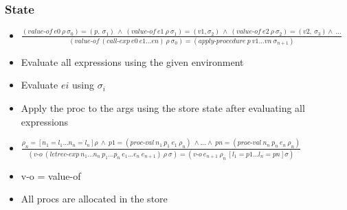 \documentclass{beamer}
\begin{document}
\begin{frame}[fragile]
\frametitle{State}
\begin{scriptsize}
\begin{itemize}
\item<1-> $\frac{(value\text{-}of \ e0 \ \rho \ \sigma_0)=(p, \ \sigma_1) \ \wedge \ (value\text{-}of \ e1 \ \rho \ \sigma_1)=(v1, \sigma_2) \ \wedge \ (value\text{-}of \ e2 \ \rho \ \sigma_2)=(v2, \ \sigma_3) \wedge \ \ldots}
    {(value\text{-}of \ (call\text{-}exp \ e0 \ e1\ldots en) \ \rho \ \sigma_0) = (apply\text{-}procedure \ p \ v1\ldots vn \ \sigma_{n+1})}$

\item<1-> Evaluate all expressions using the given environment

\item<1-> Evaluate $ei$ using $\sigma_i$

\item<1-> Apply the proc to the args using the store state after evaluating all expressions \newline

\item<2-> $\frac{\rho_n=\left[n_1=l_1\ldots n_n=l_n\right]\rho \ \wedge \ p1=(proc\text{-}val \ n_1 \ p_1 \ e_1 \ \rho_n) \ \wedge \ldots \wedge \ pn=(proc\text{-}val \ n_n \ p_n \ e_n \ \rho_n)}
                {(v\text{-}o \ (letrec\text{-}exp \ n_1\ldots n_n \ p_1\ldots p_n \ e_1\dots e_n \ e_{n+1}) \ \rho \ \sigma)=(v\text{-}o \ e_{n+1} \ \rho_n \ \left[l_1=p1\ldots l_n=pn \right]\sigma)}$

\item<2-> v-o = value-of

\item<2-> All procs are allocated in the store

\end{itemize}
\end{scriptsize}
\end{frame}
\end{document}

